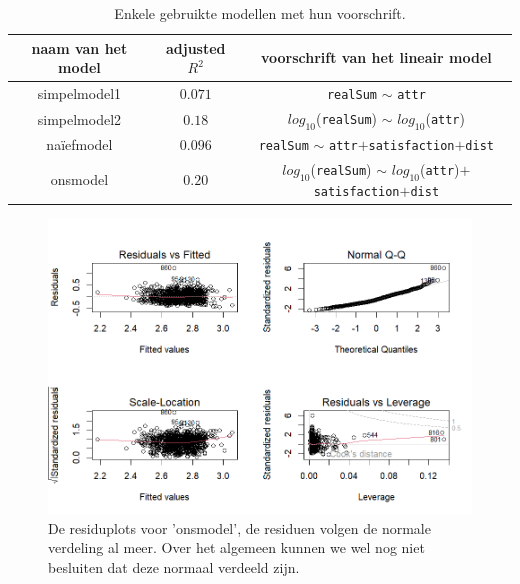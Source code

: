 \documentclass[a4paper]{kulakarticle}
\begin{document}
	\begin{table}[h]
		\centering
		\begin{tabular}{c|c|c}
			\centering
			naam van het model & adjusted $R^2$ & voorschrift van het lineair model \\
			\hline
			simpelmodel1 & $0.071$ & \verb*|realSum| $\sim$ \verb*|attr|\\
			simpelmodel2 &$0.18$ & $log_{10}$(\verb*|realSum|) $\sim$ $log_{10}$(\verb*|attr|) \\
			naïefmodel & $0.096$& \verb*|realSum| $\sim$ \verb*|attr|$+$\verb*|satisfaction|$+$\verb*|dist|\\
			onsmodel &$0.20$ & $log_{10}$(\verb*|realSum|) $\sim$ $log_{10}$(\verb*|attr|)$+$\verb*|satisfaction|$+$\verb*|dist|\\
		\end{tabular}
		\caption{Enkele gebruikte modellen met hun voorschrift.}
		\label{rsq}
	\end{table} %

	\begin{figure}
		\centering
		\includegraphics[width=0.9\linewidth]{Figuren/onsmodel}
		\caption{De residuplots voor 'onsmodel', de residuen volgen de normale verdeling al meer. Over het algemeen kunnen we wel nog niet besluiten dat deze normaal verdeeld zijn.}
		\label{fig:onsmodel}
	\end{figure}
	
\end{document}

